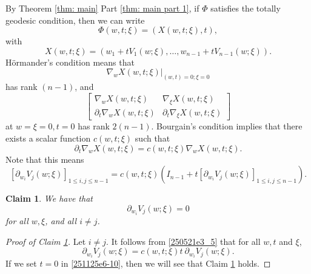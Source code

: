 \documentclass{article}
\numberwithin{equation}{section}
\theoremstyle{plain}
\newtheorem{claim}[theorem]{Claim}
\begin{document}
By Theorem \ref{thm: main} Part \ref{thm: main part 1}, if $\Phi$ satisfies the totally geodesic condition, then we can write  
\begin{equation}
\Phi(w, t; \xi)= (X(w, t; \xi), t),
\end{equation}
with 
\begin{equation}
X(w, t; \xi)= (
w_1+ t V_1(w; \xi), \dots,  w_{n-1}+ t V_{n-1}(w; \xi)
).
\end{equation}
H\"ormander's condition means that 
\begin{equation}
\left.\nabla_w X(w, t ; \xi)\right|_{(w, t)=0 ; \xi=0}
\end{equation}
has rank $(n-1)$, 
and 
\begin{equation}
\left[\begin{array}{cc}
\nabla_w X(w, t ; \xi) & \nabla_{\xi} X(w, t ; \xi) \\
\partial_t \nabla_w X(w, t ; \xi) & \partial_t \nabla_{\xi} X(w, t ; \xi)
\end{array}\right]
\end{equation}
at $w=\xi=0, t=0$ has rank $2(n-1)$. Bourgain's condition implies that there exists a scalar function $c(w, t; \xi)$ such that 
\begin{equation}
\partial_t \nabla_w X(w, t; \xi)= c(w, t; \xi) \nabla_{w}X(w, t; \xi).
\end{equation}
Note that this means 
\begin{equation}\label{250521e3_5}
[\partial_{w_i} V_j(w; \xi)]_{1\le i, j\le n-1}= c(w, t; \xi) (I_{n-1}+ t [\partial_{w_i} V_j(w; \xi)]_{1\le i, j\le n-1}).
\end{equation}
\begin{claim}\label{250521claim3_1}
We have that 
\begin{equation}
\partial_{w_i} V_j(w; \xi)=0
\end{equation}
for all $w, \xi$, and all $i\neq j$. 
\end{claim}
\begin{proof}[Proof of Claim \ref{250521claim3_1}] 
Let $i\neq j$. It follows from \eqref{250521e3_5} that for all $w,t$ and $\xi$,
\begin{equation}\label{251125e6-10}
    \partial_{w_i} V_j(w; \xi)= c(w, t; \xi)t\ \partial_{w_i} V_j(w; \xi).
\end{equation}
If we set $t=0$ in \eqref{251125e6-10}, then we will see that Claim \ref{250521claim3_1} holds.
\end{proof}
\end{document}

